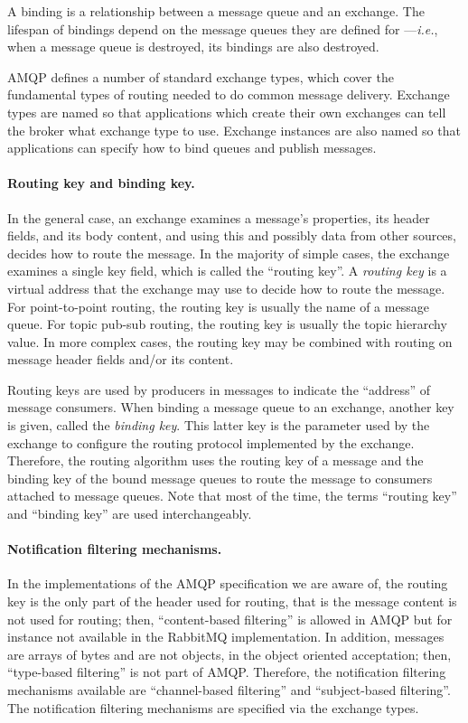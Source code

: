 A binding is a relationship between a message queue and an exchange.
The lifespan of bindings depend on the message queues they are defined
for ---\textit{i.e.}, when a message queue is destroyed, its bindings
are also destroyed.

AMQP defines a number of standard exchange types, which cover the
fundamental types of routing needed to do common message
delivery. Exchange types are named so that applications which create
their own exchanges can tell the broker what exchange type to
use. Exchange instances are also named so that applications can
specify how to bind queues and publish messages.

\paragraph{Routing key and binding key.} In the general case, an
exchange examines a message's properties, its header fields, and its
body content, and using this and possibly data from other sources,
decides how to route the message.  In the majority of simple cases,
the exchange examines a single key field, which is called the
``routing key''.  A \textit{routing key} is a virtual address that the
exchange may use to decide how to route the message.  For
point-to-point routing, the routing key is usually the name of a
message queue.  For topic pub-sub routing, the routing key is usually
the topic hierarchy value.  In more complex cases, the routing key may
be combined with routing on message header fields and/or its content.

Routing keys are used by producers in messages to indicate the
``address'' of message consumers. When binding a message queue to an
exchange, another key is given, called the \textit{binding key}. This
latter key is the parameter used by the exchange to configure the
routing protocol implemented by the exchange. Therefore, the routing
algorithm uses the routing key of a message and the binding key of the
bound message queues to route the message to consumers attached to
message queues. Note that most of the time, the terms ``routing key''
and ``binding key'' are used interchangeably.

\paragraph{Notification filtering mechanisms.} In the implementations
of the AMQP specification we are aware of, the routing key is the only
part of the header used for routing, that is the message content is
not used for routing; then, ``content-based filtering'' is allowed in
AMQP but for instance not available in the \textsf{\textsf{RabbitMQ}}
implementation. In addition, messages are arrays of bytes and are not
objects, in the object oriented acceptation; then, ``type-based
filtering'' is not part of AMQP. Therefore, the notification filtering
mechanisms available are ``channel-based filtering'' and
``subject-based filtering''. The notification filtering mechanisms are
specified via the exchange types.

